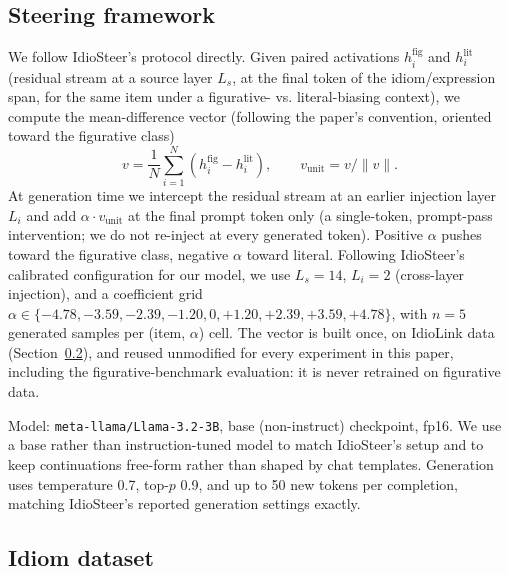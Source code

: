 \documentclass[11pt]{article}
\begin{document}
\subsection{Steering framework}

We follow IdioSteer's protocol directly. Given paired activations $h_i^{\text{fig}}$ and
$h_i^{\text{lit}}$ (residual stream at a source layer $L_s$, at the final token of the
idiom/expression span, for the same item under a figurative- vs. literal-biasing context),
we compute the mean-difference vector (following the paper's convention, oriented toward
the figurative class)
\[
v = \frac{1}{N}\sum_{i=1}^{N} \left(h_i^{\text{fig}} - h_i^{\text{lit}}\right), \qquad
v_{\text{unit}} = v / \lVert v \rVert.
\]
At generation time we intercept the residual stream at an earlier injection layer $L_i$
and add $\alpha \cdot v_{\text{unit}}$ at the final prompt token only (a single-token,
prompt-pass intervention; we do not re-inject at every generated token). Positive
$\alpha$ pushes toward the figurative class, negative $\alpha$ toward literal. Following
IdioSteer's calibrated configuration for our model, we use $L_s = 14$, $L_i = 2$
(cross-layer injection), and a coefficient grid $\alpha \in
\{-4.78,-3.59,-2.39,-1.20,0,+1.20,+2.39,+3.59,+4.78\}$, with $n=5$ generated samples per
(item, $\alpha$) cell. The vector is built once, on IdioLink data
(Section~\ref{sec:idiom-data}), and reused unmodified for every experiment in this paper,
including the figurative-benchmark evaluation: it is never retrained on figurative
data.

Model: \texttt{meta-llama/Llama-3.2-3B}, base (non-instruct) checkpoint, fp16. We use a
base rather than instruction-tuned model to match IdioSteer's setup and to keep
continuations free-form rather than shaped by chat templates. Generation uses temperature
0.7, top-$p$ 0.9, and up to 50 new tokens per completion, matching IdioSteer's reported
generation settings exactly.

\subsection{Idiom dataset}
\label{sec:idiom-data}
\end{document}
